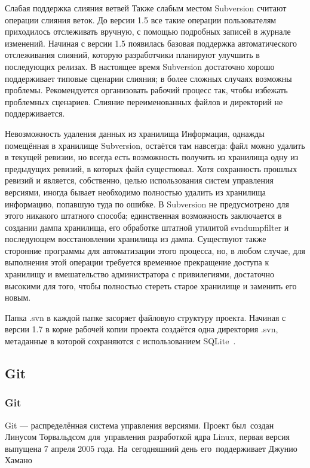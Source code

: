 \documentclass{../industrial-development}
\begin{document}
Слабая поддержка слияния ветвей
Также слабым местом Subversion считают операции слияния веток. До версии 1.5 все такие операции пользователям приходилось отслеживать вручную, с помощью подробных записей в журнале изменений. Начиная с версии 1.5 появилась базовая поддержка автоматического отслеживания слияний, которую разработчики планируют улучшить в последующих релизах. В настоящее время Subversion достаточно хорошо поддерживает типовые сценарии слияния; в более сложных случаях возможны проблемы. Рекомендуется организовать рабочий процесс так, чтобы избежать проблемных сценариев. Слияние переименованных файлов и директорий не поддерживается.

Невозможность удаления данных из хранилища
Информация, однажды помещённая в хранилище Subversion, остаётся там навсегда: файл можно удалить в текущей ревизии, но всегда есть возможность получить из хранилища одну из предыдущих ревизий, в которых файл существовал. Хотя сохранность прошлых ревизий и является, собственно, целью использования систем управления версиями, иногда бывает необходимо полностью удалить из хранилища информацию, попавшую туда по ошибке. В Subversion не предусмотрено для этого никакого штатного способа; единственная возможность заключается в создании дампа хранилища, его обработке штатной утилитой svndumpfilter и последующем восстановлении хранилища из дампа. Существуют также сторонние программы для автоматизации этого процесса, но, в любом случае, для выполнения этой операции требуется временное прекращение доступа к хранилищу и вмешательство администратора с привилегиями, достаточно высокими для того, чтобы полностью стереть старое хранилище и заменить его новым.

Папка .svn в каждой папке
засоряет файловую структуру проекта. Начиная с версии 1.7 в корне рабочей копии проекта создаётся одна директория .svn, метаданные в которой сохраняются с использованием SQLite~\cite{SVNWikipedia}.

\subsection{Git}

\begin{frame} \frametitle{Git}
  \begin{block}{}
    \alert{Git} --- распределённая система управления версиями. Проект был~создан Линусом Торвальдсом для~управления разработкой ядра Linux, первая версия выпущена 7 апреля 2005 года. На~сегодняшний день его~поддерживает Джунио Хамано
  \end{block}
\end{frame}
\end{document}
